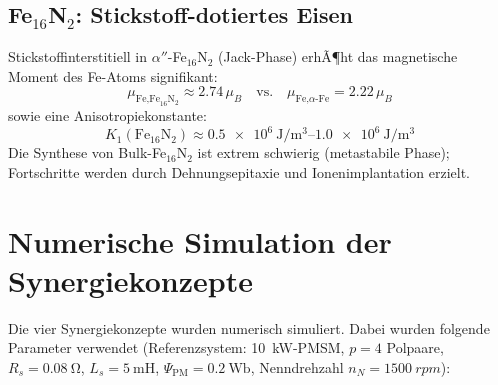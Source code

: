 ﻿\documentclass[12pt, a4paper]{report}
\theoremstyle{definition}
\theoremstyle{remark}
\begin{document}
\subsection{\texorpdfstring{Fe$_{16}$N$_2$: Stickstoff-dotiertes Eisen}{Fe16N2: Stickstoff-dotiertes Eisen}}

Stickstoffinterstitiell in $\alpha''$-Fe$_{16}$N$_2$ (Jack-Phase) erhÃ¶ht das
magnetische Moment des Fe-Atoms signifikant:
\begin{equation}
  \mu_{\text{Fe,Fe}_{16}\text{N}_2} \approx 2.74\,\mu_B
  \quad \text{vs.} \quad
  \mu_{\text{Fe,}\alpha\text{-Fe}} = 2.22\,\mu_B
  \label{eq:mu_FeN}
\end{equation}
sowie eine Anisotropiekonstante:
\begin{equation}
  K_1(\text{Fe}_{16}\text{N}_2) \approx \SIrange{0.5e6}{1.0e6}{\joule\per\cubic\metre}
\end{equation}
Die Synthese von Bulk-Fe$_{16}$N$_2$ ist extrem schwierig (metastabile Phase);
Fortschritte werden durch Dehnungsepitaxie und Ionenimplantation erzielt.

\section{Numerische Simulation der Synergiekonzepte}
\label{ssec:numerik_syn}

Die vier Synergiekonzepte wurden numerisch simuliert. Dabei wurden folgende
Parameter verwendet (Referenzsystem: \SI{10}{\kilo\watt}-PMSM,
$p = 4$ Polpaare, $R_s = \SI{0.08}{\ohm}$, $L_s = \SI{5}{\milli\henry}$,
$\Psi_{\text{PM}} = \SI{0.2}{\weber}$, Nenndrehzahl $n_N = \SI{1500}{rpm}$):
\end{document}
